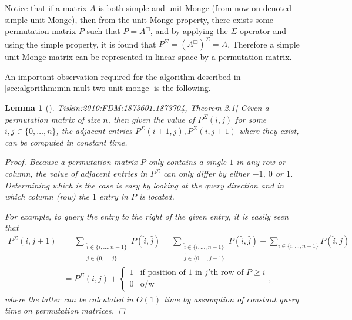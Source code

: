 \documentclass[twoside,11pt,openright]{report}
\newcommand{\reftiskin}[2]{\cite[#1]{Tiskin:2010:FDM:1873601.1873704}, #2}
\newtheorem{lemma}{Lemma}
\begin{document}
Notice that if a matrix $A$ is both simple and unit-Monge (from now on denoted simple unit-Monge), then from the unit-Monge property, there exists some permutation matrix $P$ such that $P = A^{\Box}$, and by applying the $\Sigma$-operator and using the simple property, it is found that $P^\Sigma = (A^{\Box})^{\Sigma} = A$. Therefore a simple unit-Monge matrix can be represented in linear space by a permutation matrix.

An important observation required for the algorithm described in \cref{sec:algorithm:min-mult-two-unit-monge} is the following.
\begin{lemma}[\reftiskin{p. 1288}{Theorem 2.1}]
  \label{lemma:simple-unit-monge-query-next}
  Given a permutation matrix of size $n$, then given the value of $P^{\Sigma}(i, j)$ for some $i, j \in \{0, \dots, n\}$, the adjacent entries $P^{\Sigma}(i \pm 1, j), P^{\Sigma}(i, j \pm 1)$ where they exist, can be computed in constant time.
  \begin{proof}
    Because a permutation matrix $P$ only contains a single $1$ in any row or column, the value of adjacent entries in $P^{\Sigma}$ can only differ by either $-1$, $0$ or $1$. Determining which is the case is easy by looking at the query direction and in which column (row) the $1$ entry in $P$ is located.

    For example, to query the entry to the right of the given entry, it is easily seen that
    \begin{align*}
      P^{\Sigma}(i, j + 1) &= \sum_{\substack{\hat{i} \in \{i, \dots, n - 1\} \\ \hat{j} \in \{0, \dots, j\}}} P(\hat{i}, \hat{j})
        = \sum_{\substack{\hat{i} \in \{i, \dots, n - 1\} \\ \hat{j} \in \{0, \dots, j - 1\}}} P(\hat{i}, \hat{j}) + \sum_{\hat{i} \in \{i, \dots, n - 1\}} P(\hat{i}, j) \\
        &= P^{\Sigma}(i, j) + \begin{cases}
            1  & \text{if position of $1$ in $j$'th row of $P \geq i$} \\
            0  & \text{o/w}
          \end{cases},
    \end{align*}
    where the latter can be calculated in $O(1)$ time by assumption of constant query time on permutation matrices.
  \end{proof}
\end{lemma}
\end{document}
